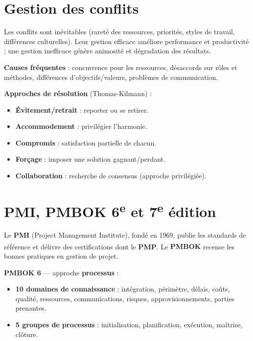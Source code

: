 \documentclass[11pt,a4paper]{article}
\begin{document}
\section{Gestion des conflits}

Les conflits sont inévitables (rareté des ressources, priorités, styles de travail, différences culturelles). Leur gestion efficace améliore performance et productivité ; une gestion inefficace génère animosité et dégradation des résultats.

\textbf{Causes fréquentes} : concurrence pour les ressources, désaccords sur rôles et méthodes, différences d'objectifs/valeurs, problèmes de communication.

\textbf{Approches de résolution} (Thomas-Kilmann) :
\begin{itemize}
    \item \textbf{Évitement/retrait} : reporter ou se retirer.
    \item \textbf{Accommodement} : privilégier l'harmonie.
    \item \textbf{Compromis} : satisfaction partielle de chacun.
    \item \textbf{Forçage} : imposer une solution gagnant/perdant.
    \item \textbf{Collaboration} : recherche de consensus (approche privilégiée).
\end{itemize}

\section{PMI, PMBOK 6\textsuperscript{e} et 7\textsuperscript{e} édition}

Le \textbf{PMI} (Project Management Institute), fondé en 1969, publie les standards de référence et délivre des certifications dont le \textbf{PMP}. Le \textbf{PMBOK\textsuperscript{\textregistered}} recense les bonnes pratiques en gestion de projet.

\textbf{PMBOK 6} --- approche \textbf{processus} :
\begin{itemize}
    \item \textbf{10 domaines de connaissance} : intégration, périmètre, délais, coûts, qualité, ressources, communications, risques, approvisionnements, parties prenantes.
    \item \textbf{5 groupes de processus} : initialisation, planification, exécution, maîtrise, clôture.
\end{itemize}
\end{document}
